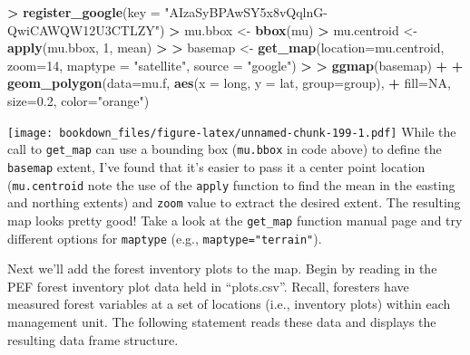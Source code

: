 \documentclass[
]{krantz}
\makeatletter
\newenvironment{Shaded}{\begin{snugshade}}{\end{snugshade}}
\newcommand{\DataTypeTok}[1]{\textcolor[rgb]{0.27,0.27,0.27}{#1}}
\newcommand{\DecValTok}[1]{\textcolor[rgb]{0.06,0.06,0.06}{#1}}
\newcommand{\ErrorTok}[1]{\textcolor[rgb]{0.14,0.14,0.14}{\textbf{#1}}}
\newcommand{\FloatTok}[1]{\textcolor[rgb]{0.06,0.06,0.06}{#1}}
\newcommand{\KeywordTok}[1]{\textcolor[rgb]{0.27,0.27,0.27}{\textbf{#1}}}
\newcommand{\NormalTok}[1]{#1}
\newcommand{\OperatorTok}[1]{\textcolor[rgb]{0.43,0.43,0.43}{\textbf{#1}}}
\newcommand{\OtherTok}[1]{\textcolor[rgb]{0.37,0.37,0.37}{#1}}
\newcommand{\StringTok}[1]{\textcolor[rgb]{0.5,0.5,0.5}{#1}}
\newenvironment{kframe}{%
\medskip{}
\setlength{\fboxsep}{.8em}
 \def\at@end@of@kframe{}%
 \ifinner\ifhmode%
  \def\at@end@of@kframe{\end{minipage}}%
  \begin{minipage}{\columnwidth}%
 \fi\fi%
 \def\FrameCommand##1{\hskip\@totalleftmargin \hskip-\fboxsep
 \colorbox{shadecolor}{##1}\hskip-\fboxsep
     \hskip-\linewidth \hskip-\@totalleftmargin \hskip\columnwidth}%
 \MakeFramed {\advance\hsize-\width
   \@totalleftmargin\z@ \linewidth\hsize
   \@setminipage}}%
 {\par\unskip\endMakeFramed%
 \at@end@of@kframe}
\renewenvironment{Shaded}{\begin{kframe}}{\end{kframe}}
\makeatother
\begin{document}
\begin{Shaded}
\begin{Highlighting}[]
\OperatorTok{\textgreater{}}\StringTok{ }\KeywordTok{register\_google}\NormalTok{(}\DataTypeTok{key =} \StringTok{"AIzaSyBPAwSY5x8vQqlnG{-}QwiCAWQW12U3CTLZY"}\NormalTok{)}
\OperatorTok{\textgreater{}}\StringTok{ }\NormalTok{mu.bbox \textless{}{-}}\StringTok{ }\KeywordTok{bbox}\NormalTok{(mu)}
\OperatorTok{\textgreater{}}\StringTok{ }\NormalTok{mu.centroid \textless{}{-}}\StringTok{ }\KeywordTok{apply}\NormalTok{(mu.bbox, }\DecValTok{1}\NormalTok{, mean)}
\OperatorTok{\textgreater{}}\StringTok{ }
\ErrorTok{\textgreater{}}\StringTok{ }\NormalTok{basemap \textless{}{-}}\StringTok{ }\KeywordTok{get\_map}\NormalTok{(}\DataTypeTok{location=}\NormalTok{mu.centroid, }\DataTypeTok{zoom=}\DecValTok{14}\NormalTok{, }\DataTypeTok{maptype =} \StringTok{"satellite"}\NormalTok{, }\DataTypeTok{source =} \StringTok{"google"}\NormalTok{)}
\OperatorTok{\textgreater{}}\StringTok{                                     }
\ErrorTok{\textgreater{}}\StringTok{ }\KeywordTok{ggmap}\NormalTok{(basemap) }\OperatorTok{+}\StringTok{ }
\OperatorTok{+}\StringTok{   }\KeywordTok{geom\_polygon}\NormalTok{(}\DataTypeTok{data=}\NormalTok{mu.f, }\KeywordTok{aes}\NormalTok{(}\DataTypeTok{x =}\NormalTok{ long, }\DataTypeTok{y =}\NormalTok{ lat, }\DataTypeTok{group=}\NormalTok{group), }
\OperatorTok{+}\StringTok{                  }\DataTypeTok{fill=}\OtherTok{NA}\NormalTok{, }\DataTypeTok{size=}\FloatTok{0.2}\NormalTok{, }\DataTypeTok{color=}\StringTok{"orange"}\NormalTok{)}
\end{Highlighting}
\end{Shaded}

\texttt{[image: bookdown\_files/figure-latex/unnamed-chunk-199-1.pdf]}
While the call to \texttt{get\_map} can use a bounding box (\texttt{mu.bbox} in code above) to define the \texttt{basemap} extent, I've found that it's easier to pass it a center point location (\texttt{mu.centroid} note the use of the \texttt{apply} function to find the mean in the easting and northing extents) and \texttt{zoom} value to extract the desired extent. The resulting map looks pretty good! Take a look at the \texttt{get\_map} function manual page and try different options for \texttt{maptype} (e.g., \texttt{maptype="terrain"}).

Next we'll add the forest inventory plots to the map. Begin by reading in the PEF forest inventory plot data held in ``plots.csv''. Recall, foresters have measured forest variables at a set of locations (i.e., inventory plots) within each management unit. The following statement reads these data and displays the resulting data frame structure.
\end{document}
